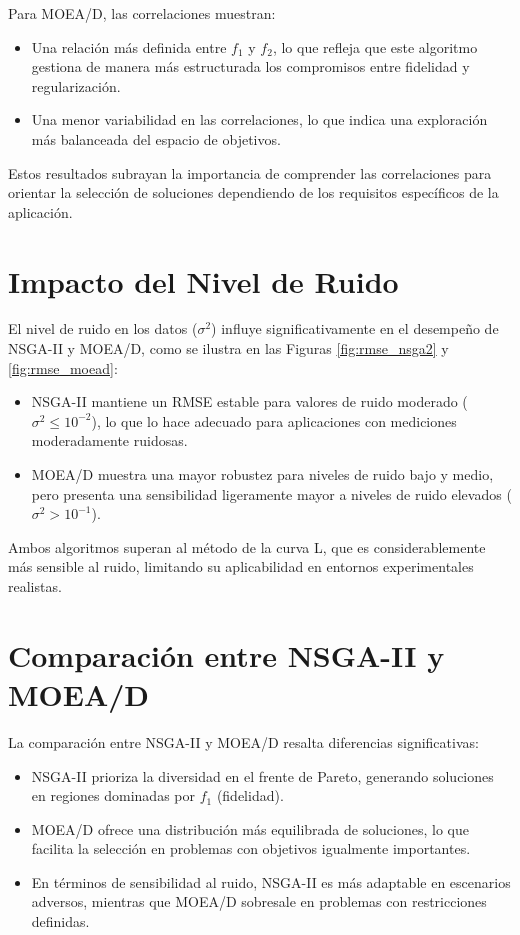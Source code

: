 Para MOEA/D, las correlaciones muestran:
\begin{itemize}
    \item Una relación más definida entre \( f_1 \) y \( f_2 \), lo que refleja que este algoritmo gestiona de manera más estructurada los compromisos entre fidelidad y regularización.
    \item Una menor variabilidad en las correlaciones, lo que indica una exploración más balanceada del espacio de objetivos.
\end{itemize}

Estos resultados subrayan la importancia de comprender las correlaciones para orientar la selección de soluciones dependiendo de los requisitos específicos de la aplicación.

\section{Impacto del Nivel de Ruido} \label{sec:analysis:noise}

El nivel de ruido en los datos (\( \sigma^2 \)) influye significativamente en el desempeño de NSGA-II y MOEA/D, como se ilustra en las Figuras \ref{fig:rmse_nsga2} y \ref{fig:rmse_moead}:
\begin{itemize}
    \item NSGA-II mantiene un RMSE estable para valores de ruido moderado (\( \sigma^2 \leq 10^{-2} \)), lo que lo hace adecuado para aplicaciones con mediciones moderadamente ruidosas.
    \item MOEA/D muestra una mayor robustez para niveles de ruido bajo y medio, pero presenta una sensibilidad ligeramente mayor a niveles de ruido elevados (\( \sigma^2 > 10^{-1} \)).
\end{itemize}

Ambos algoritmos superan al método de la curva L, que es considerablemente más sensible al ruido, limitando su aplicabilidad en entornos experimentales realistas.

\section{Comparación entre NSGA-II y MOEA/D} \label{sec:analysis:comparison}

La comparación entre NSGA-II y MOEA/D resalta diferencias significativas:
\begin{itemize}
    \item NSGA-II prioriza la diversidad en el frente de Pareto, generando soluciones en regiones dominadas por \( f_1 \) (fidelidad).
    \item MOEA/D ofrece una distribución más equilibrada de soluciones, lo que facilita la selección en problemas con objetivos igualmente importantes.
    \item En términos de sensibilidad al ruido, NSGA-II es más adaptable en escenarios adversos, mientras que MOEA/D sobresale en problemas con restricciones definidas.
\end{itemize}

